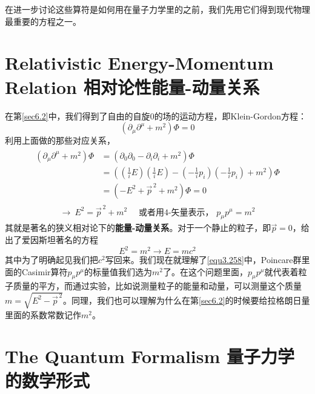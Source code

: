 在进一步讨论这些算符是如何用在量子力学里的之前，我们先用它们得到现代物理最重要的方程之一。
\section[相对论性能量-动量关系]{Relativistic Energy-Momentum Relation 相对论性能量-动量关系}\label{sec8.2}
在第\ref{sec6.2}中，我们得到了自由的自旋$0$的场的运动方程，即Klein-Gordon方程：
\[(\partial_\mu\partial^\mu+m^2)\Phi=0 \]
利用上面做的那些对应关系，
\begin{align}\begin{split}
(\partial_\mu\partial^\mu+m^2)\Phi&=(\partial_0\partial_0-\partial_i\partial_i+m^2)\Phi\\
&=\left(\left(\frac{1}{i}E\right)\left(\frac{1}{i}E\right)-\left(-\frac{1}{i}p_i\right)\left(-\frac{1}{i}p_i\right)+m^2\right)\Phi\\
&=(-E^2+\vec{p}^{\,2}+m^2)\Phi=0
\end{split}\end{align}
\begin{align}
\to\ E^2=\vec{p}^{\,2}+m^2\quad\text{ 或者用4-矢量表示， }p_\mu p^\mu=m^2
\end{align}
其就是著名的狭义相对论下的{\bf 能量-动量关系}。对于一个静止的粒子，即$\vec{p}=0$，给出了爱因斯坦著名的方程
\[E^2=m^2\to E=mc^2 \]
其中为了明确起见我们把$c^2$写回来。我们现在就理解了\eqref{equ3.258}中，Poincare群里面的Casimir算符$p_\mu p^\mu$的标量值我们选为$m^2$了。在这个问题里面，$p_\mu p^\mu$就代表着粒子质量的平方，而通过实验，比如说测量粒子的能量和动量，可以测量这个质量$m=\sqrt{E^2-\vec{p}^{\,2}}$。同理，我们也可以理解为什么在第\ref{sec6.2}的时候要给拉格朗日量里面的系数常数记作$m^2$。

\section[量子力学的数学形式]{The Quantum Formalism 量子力学的数学形式}

